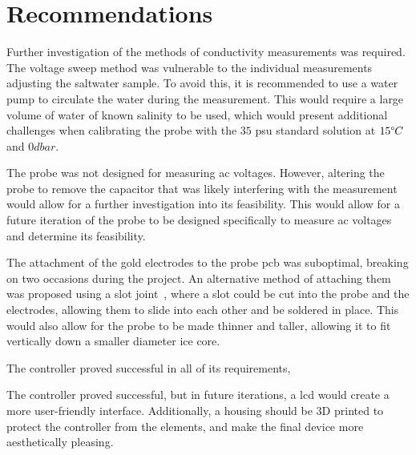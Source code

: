 
\chapter{Recommendations}\label{ch:recommendations}

Further investigation of the methods of conductivity measurements was required.
The voltage sweep method was vulnerable to the individual measurements adjusting the saltwater sample.
To avoid this, it is recommended to use a water pump to circulate the water during the measurement.
This would require a large volume of water of known salinity to be used, which would present additional challenges when calibrating the probe with the $35$ \gls{psu} standard solution at $15\degree C$ and $0dbar$.

The probe was not designed for measuring \gls{ac} voltages.
However, altering the probe to remove the capacitor that was likely interfering with the measurement would allow for a further investigation into its feasibility.
This would allow for a future iteration of the probe to be designed specifically to measure \gls{ac} voltages and determine its feasibility.

The attachment of the gold electrodes to the probe \gls{pcb} was suboptimal, breaking on two occasions during the project.
An alternative method of attaching them was proposed using a slot joint~\cite{nicolaas_slot_joint_2015}, where a slot could be cut into the probe and the electrodes, allowing them to slide into each other and be soldered in place.
This would also allow for the probe to be made thinner and taller, allowing it to fit vertically down a smaller diameter ice core.

The controller proved successful in all of its requirements, 

The controller proved successful, but in future iterations, a \gls{lcd} would create a more user-friendly interface.
Additionally, a housing should be 3D printed to protect the controller from the elements, and make the final device more aesthetically pleasing.

